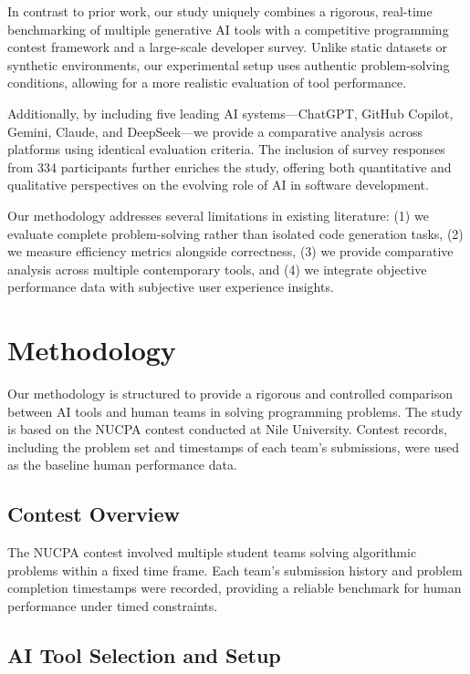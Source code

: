 \documentclass[conference]{IEEEtran}
\begin{document}
In contrast to prior work, our study uniquely combines a rigorous, real-time benchmarking of multiple generative AI tools with a competitive programming contest framework and a large-scale developer survey. Unlike static datasets or synthetic environments, our experimental setup uses authentic problem-solving conditions, allowing for a more realistic evaluation of tool performance. 

Additionally, by including five leading AI systems—ChatGPT, GitHub Copilot, Gemini, Claude, and DeepSeek—we provide a comparative analysis across platforms using identical evaluation criteria. The inclusion of survey responses from 334 participants further enriches the study, offering both quantitative and qualitative perspectives on the evolving role of AI in software development.

Our methodology addresses several limitations in existing literature: (1) we evaluate complete problem-solving rather than isolated code generation tasks, (2) we measure efficiency metrics alongside correctness, (3) we provide comparative analysis across multiple contemporary tools, and (4) we integrate objective performance data with subjective user experience insights.

\section{Methodology}

Our methodology is structured to provide a rigorous and controlled comparison between AI tools and human teams in solving programming problems. The study is based on the NUCPA contest conducted at Nile University. Contest records, including the problem set and timestamps of each team's submissions, were used as the baseline human performance data.

\subsection{Contest Overview}

The NUCPA contest involved multiple student teams solving algorithmic problems within a fixed time frame. Each team's submission history and problem completion timestamps were recorded, providing a reliable benchmark for human performance under timed constraints.

\subsection{AI Tool Selection and Setup}
\end{document}
